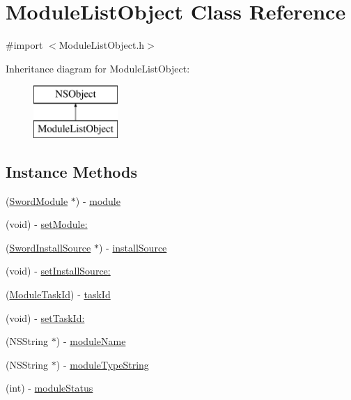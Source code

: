 \hypertarget{interface_module_list_object}{\section{Module\-List\-Object Class Reference}
\label{interface_module_list_object}
}


{\ttfamily \#import $<$Module\-List\-Object.\-h$>$}

Inheritance diagram for Module\-List\-Object\-:\begin{figure}[H]
\begin{center}
\leavevmode
\includegraphics[height=2.000000cm]{interface_module_list_object}
\end{center}
\end{figure}
\subsection*{Instance Methods}
\begin{DoxyCompactItemize}
\item 
(\hyperlink{interface_sword_module}{Sword\-Module} $\ast$) -\/ \hyperlink{interface_module_list_object_a1f3f4f8432ddf2a3cbd896bc378b688b}{module}
\item 
(void) -\/ \hyperlink{interface_module_list_object_ae26caecbc202b0aea918da4a3f8438a7}{set\-Module\-:}
\item 
(\hyperlink{interface_sword_install_source}{Sword\-Install\-Source} $\ast$) -\/ \hyperlink{interface_module_list_object_afe3a4daa2c93ed90f23af0c6ba8def8e}{install\-Source}
\item 
(void) -\/ \hyperlink{interface_module_list_object_af68ecc4c461c8204d559124bc53fafb0}{set\-Install\-Source\-:}
\item 
(\hyperlink{_module_list_object_8h_a823a09788bb07ad2cb506654ba727b59}{Module\-Task\-Id}) -\/ \hyperlink{interface_module_list_object_a5d8c615420cc9275e699636c6d775e41}{task\-Id}
\item 
(void) -\/ \hyperlink{interface_module_list_object_a50f9fe8a73f176d886e2370eab9f802e}{set\-Task\-Id\-:}
\item 
(N\-S\-String $\ast$) -\/ \hyperlink{interface_module_list_object_aa6bba1dd50cc6bfc283fa152a9b7bb49}{module\-Name}
\item 
(N\-S\-String $\ast$) -\/ \hyperlink{interface_module_list_object_a6be6ffd90aa4fc5d023d9e0b7a11ef8b}{module\-Type\-String}
\item 
(int) -\/ \hyperlink{interface_module_list_object_a2c0586c342c58053bfa38beac15550aa}{module\-Status}
\end{DoxyCompactItemize}
